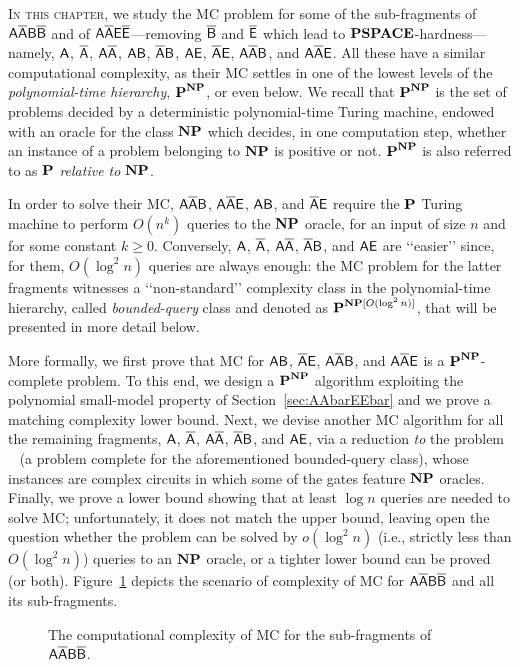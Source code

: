 \lettrine[lines=3]{I}{n this chapter,} we study the MC problem for some of the sub-fragments of $\mathsf{A\overline{A}B\overline{B}}$ and of $\mathsf{A\overline{A}E\overline{E}}$---removing $\mathsf{\overline{B}}$ and $\mathsf{\overline{E}}$ which lead to $\textbf{PSPACE}$-hardness---namely, $\mathsf{A}$, $\mathsf{\overline{A}}$, $\mathsf{A\overline{A}}$, $\mathsf{AB}$, $\mathsf{\overline{A}B}$, $\mathsf{AE}$, $\mathsf{\overline{A}E}$, $\mathsf{A\overline{A}B}$, and  $\mathsf{A\overline{A}E}$.
All these have a similar computational complexity, as their MC settles in one of the lowest levels of the \emph{polynomial-time hierarchy}, $\textbf{P}^{\textbf{NP}}$, or even below. 
We recall that $\textbf{P}^{\textbf{NP}}$ is the set of problems decided by a deterministic polynomial-time Turing machine, endowed with an oracle for the class $\textbf{NP}$
which decides, in one computation step, whether an instance of a problem belonging to $\textbf{NP}$ is positive or not. 
$\textbf{P}^{\textbf{NP}}$ is also referred to as $\textbf{P}$ \emph{relative to} $\textbf{NP}$.

In order to solve their MC, $\mathsf{A\overline{A}B}$, $\mathsf{A\overline{A}E}$, $\mathsf{AB}$, and $\mathsf{\overline{A}E}$ require the $\textbf{P}$ Turing machine to perform $O(n^k)$
queries to the $\textbf{NP}$ oracle, for an input of size $n$ and for some constant $k\geq 0$.
Conversely, $\mathsf{A}$, $\mathsf{\overline{A}}$, $\mathsf{A\overline{A}}$, $\mathsf{\overline{A}B}$, and $\mathsf{AE}$ are \lq\lq easier\rq\rq{}
since, for them, $O(\log^2 n)$ queries are always enough:
the MC problem for the latter fragments witnesses
a \lq\lq non-standard\rq\rq{} complexity class in the polynomial-time hierarchy, called \emph{bounded-query} class and denoted as $\textbf{P}^{\textbf{NP}[O(\log^2 n)]}$, that will be presented in more detail below.

More formally, we first prove that MC for $\mathsf{AB}$, $\mathsf{\overline{A}E}$, $\mathsf{A\overline{A}B}$, and $\mathsf{A\overline{A}E}$ is a $\textbf{P}^{\textbf{NP}}$-complete problem.
To this end, we design a $\textbf{P}^{\textbf{NP}}$ algorithm exploiting the polynomial small-model property of Section~\ref{sec:AAbarEEbar} and we prove a matching complexity lower bound.%
%
Next, we devise another MC algorithm for all the remaining fragments, $\mathsf{A}$, $\mathsf{\overline{A}}$, $\mathsf{A\overline{A}}$, $\mathsf{\overline{A}B}$, and $\mathsf{AE}$, via a reduction \emph{to} the problem \TBSATM~\cite{schnoebelen2003} (a problem complete for the aforementioned bounded-query class), whose instances are complex circuits in which some of the gates feature $\textbf{NP}$ oracles.
Finally, we prove a lower bound showing that at least $\log n$ queries are needed to solve MC; unfortunately, it does not match the upper bound, leaving open the question whether the problem can be solved by $o(\log^2 n)$ (i.e., strictly less than $O(\log^2 n)$) queries to an $\textbf{NP}$ oracle, or a tighter lower bound can be proved (or both).
%
Figure~\ref{fig:lattice} depicts the scenario of complexity of MC for $\mathsf{A\overline{A}B\overline{B}}$ and all its sub-fragments.
\begin{sidewaysfigure}
    \centering
    
    \caption{The computational complexity of MC for the sub-fragments of $\mathsf{A\overline{A}B\overline{B}}$.}
    \label{fig:lattice}
\end{sidewaysfigure}

